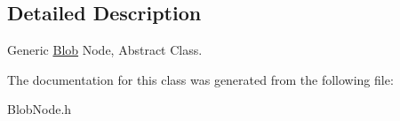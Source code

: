 \subsection{Detailed Description}
Generic \hyperlink{class_blob}{Blob} Node, Abstract Class. 

The documentation for this class was generated from the following file:\begin{DoxyCompactItemize}
\item 
BlobNode.h\end{DoxyCompactItemize}
